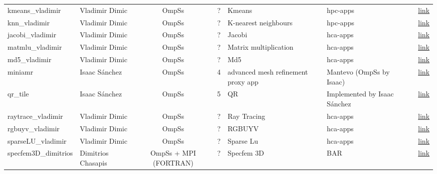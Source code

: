 \documentclass[landscape]{article}
\newcommand{\cm}{\ding{51}}%
\newcommand{\xm}{\ding{55}}%
\begin{document}
\begin{table}[h!]
{\begin{tabular}{@{}llccllcc@{}}
      {kmeans\_vladimir            } & Vladimir Dimic     & OmpSs                 & ?  & Kmeans                                     & hpc-apps                         & \xm & \hyperref[kmeans_vladimir]{link}\\
      {knn\_vladimir               } & Vladimir Dimic     & OmpSs                 & ?  & K-nearest neighbours                       & hpc-apps                         & \xm & \hyperref[knn_vladimir]{link}\\
      {jacobi\_vladimir            } & Vladimir Dimic     & OmpSs                 & ?  & Jacobi                                     & hca-apps                         & \xm & \hyperref[jacobi_vladimir]{link}\\
      {matmlu\_vladimir            } & Vladimir Dimic     & OmpSs                 & ?  & Matrix multiplication                      & hca-apps                         & \xm & \hyperref[matmul_vladimir]{link}\\
    {md5\_vladimir               } & Vladimir Dimic     & OmpSs                 & ?  & Md5                                        & hca-apps                         & \xm & \hyperref[md5_vladimir]{link}\\
    {miniamr                       } & Isaac S\'anchez    & OmpSs                 & 4  & advanced mesh refinement proxy app         & Mantevo (OmpSs by Isaac)         & \cm & \hyperref[miniamr:ompss]{link}\\
      {qr\_tile                    } & Isaac S\'anchez    & OmpSs                 & 5  & QR                                         & Implemented by Isaac S\'anchez   & \cm & \hyperref[qr_tile]{link}\\
      {raytrace\_vladimir          } & Vladimir Dimic     & OmpSs                 & ?  & Ray Tracing                                & hca-apps                         & \xm & \hyperref[raytrace_vladimir]{link}\\
      {rgbuyv\_vladimir            } & Vladimir Dimic     & OmpSs                 & ?  & RGBUYV                                     & hca-apps                         & \xm & \hyperref[rgbuyv_vladimir]{link}\\
      {sparseLU\_vladimir          } & Vladimir Dimic     & OmpSs                 & ?  & Sparse Lu                                  & hca-apps                         & \xm & \hyperref[sparselu_vladimir]{link}\\
      {specfem3D\_dimitrios        } & Dimitrios Chasapis & OmpSs + MPI (FORTRAN) & ?  & Specfem 3D                                 & BAR                              & \xm & \hyperref[specfem3D_dimitrios]{link}\\

\end{tabular}}
\end{table}
\end{document}
